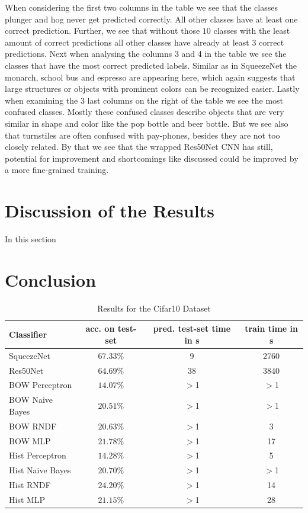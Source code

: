 \documentclass[11pt]{article}
\begin{document}
When considering the first two columns in the table we see that the classes plunger and hog never get predicted correctly. All other classes have at least one correct prediction. Further, we see that without those $10$ classes with the least amount of correct predictions all other classes have already at least 3 correct predictions. Next when analysing the columns 3 and 4 in the table we see the classes that have the most correct predicted labels. Similar as in SqueezeNet the monarch, school bus and espresso are appearing here, which again suggests that large structures or objects with prominent colors can be recognized easier. Lastly when examining the 3 last columns on the right of the table we see the most confused classes. Mostly these confused classes describe objects that are very similar in shape and color like the pop bottle and beer bottle. But we see also that turnstiles are often confused with pay-phones, besides they are not too closely related. By that we see that the wrapped Res50Net CNN has still, potential for improvement and shortcomings like discussed could be improved by a more fine-grained training.

\section{Discussion of the Results}
In this section

\section{Conclusion}

\begin{table}
	\centering
	\begin{tabular}{l|c|c|c}
	\toprule
		Classifier        & acc. on test-set  & pred. test-set time in s & train time in s\\
	\midrule
		SqueezeNet 		  & $67.33\%$         & 9 						 & 2760\\
		Res50Net   		  & $64.69\%$         & 38 						 & 3840\\
		BOW Perceptron    & $14.07\%$         & $>$1 					 & $>$1\\
		BOW Naive Bayes   & $20.51\%$         & $>$1 					 & $>$1\\
		BOW RNDF  		  & $20.63\%$         & $>$1 					 & 3   \\
		BOW MLP  		  & $21.78\%$         & $>$1 					 & 17  \\
		Hist Perceptron   & $14.28\%$         & $>$1 					 & 5   \\
		Hist Naive Bayes  & $20.70\%$         & $>$1 					 & $>$1\\
		Hist RNDF         & $24.20\%$         & $>$1 					 & 14  \\
		Hist MLP          & $21.15\%$         & $>$1 					 & 28  \\
	\bottomrule
	\end{tabular}
	\caption{Results for the Cifar10 Dataset}
\label{conc::1}
\end{table}
\end{document}
